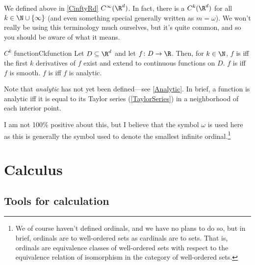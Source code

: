 We defined above in \cref{CinftyRd} $C^{\infty}(\R ^d)$.  In fact, there is a $C^k(\R ^d)$ for all $k\in \N \cup \{ \infty \}$ (and even something special generally written as $m=\omega$).  We won't really be using this terminology much ourselves, but it's quite common, and so you should be aware of what it means.
\begin{dfn}{$C^k$ function}{Ckfunction}
Let $D\subseteq \R ^d$ and let $f\colon D\rightarrow \R$.  Then, for $k\in \N$, $f$ is  iff the first $k$ derivatives of $f$ exist and extend to continuous functions on $D$.  $f$ is  iff $f$ is smooth.  $f$ is  iff $f$ is analytic.
\begin{rmk}
Note that \emph{analytic} has not yet been defined---see \cref{Analytic}.  In brief, a function is analytic iff it is equal to its Taylor series (\cref{TaylorSeries}) in a neighborhood of each interior point.
\end{rmk}
\begin{rmk}
I am not 100\% positive about this, but I believe that the symbol $\omega$ is used here as this is generally the symbol used to denote the smallest infinite ordinal.\footnote{We of course haven't defined ordinals, and we have no plans to do so, but in brief, ordinals are to well-ordered sets as cardinals are to sets.  That is, ordinals are equivalence classes of well-ordered sets with respect to the equivalence relation of isomorphism in the category of well-ordered sets.}
\end{rmk}
\end{dfn}

\section{Calculus}

\subsection{Tools for calculation}

